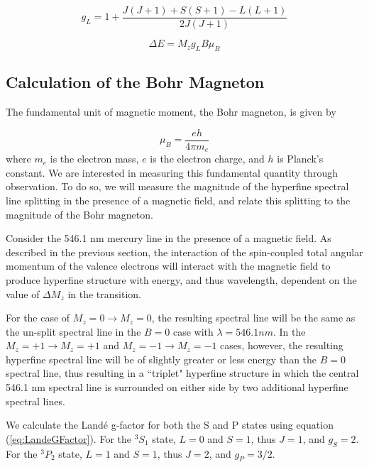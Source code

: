 \documentclass[twocolumn]{article}
\begin{document}
		\begin{equation}
			g_L = 1 + \frac{J(J+1) + S(S+1) - L(L+1)}{2J(J+1)}
			\label{eq:LandeGFactor}
		\end{equation}
		
		\begin{equation}
			\Delta E = M_z g_L B \mu_B
			\label{eq:EnergyShift}
		\end{equation}
		
		\subsection{Calculation of the Bohr Magneton} \label{subsec:BohrCalc}
			The fundamental unit of magnetic moment, the Bohr magneton, is given by
			
			\begin{equation}
				\mu_B = \frac{eh}{4\pi m_e}
			\end{equation}
			where $m_e$ is the electron mass, $e$ is the electron charge, and $h$ is Planck's constant.
			We are interested in measuring this fundamental quantity through observation.
			To do so, we will measure the magnitude of the hyperfine spectral line splitting in the presence of a magnetic field, and relate this splitting to the magnitude of the Bohr magneton.
			
			Consider the 546.1 nm mercury line in the presence of a magnetic field.
			As described in the previous section, the interaction of the spin-coupled total angular momentum of the valence electrons will interact with the magnetic field to produce hyperfine structure with energy, and thus wavelength, dependent on the value of $\Delta M_z$ in the transition.
			
			For the case of $M_z = 0 \rightarrow M_z = 0$, the resulting spectral line will be the same as the un-split spectral line in the $B=0$ case with $\lambda = 546.1 nm$.
			In the $M_z = +1 \rightarrow M_z = +1$ and $M_z = -1 \rightarrow M_z = -1$ cases, however, the resulting hyperfine spectral line will be of slightly greater or less energy than the $B=0$ spectral line, thus resulting in a ``triplet" hyperfine structure in which the central 546.1 nm spectral line is surrounded on either side by two additional hyperfine spectral lines.
			
			We calculate the Land\'{e} g-factor for both the S and P states using equation (\ref{eq:LandeGFactor}).
			For the $^3S_1$ state, $L=0$ and $S=1$, thus $J = 1$, and $g_S = 2$.
			For the $^3P_2$ state, $L=1$ and $S=1$, thus $J=2$, and $g_P = 3/2$.
			
\end{document}
